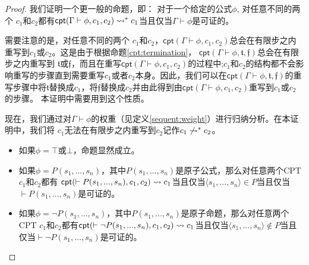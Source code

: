\begin{proof}
	我们证明一个更一般的命题，即：
	对于一个给定的公式$\phi$, 对任意不同的两个\CPT{} $c_1$和$c_2$都有$\textsf{cpt}(\Gamma \vdash\phi, c_1, c_2) 
	\rightsquigarrow^* c_1$当且仅当$\Gamma \vdash \phi$是可证的。 
	
	
	需要注意的是，对任意不同的两个\CPT{} $c_1$和$c_2$，$\textsf{cpt}(\Gamma \vdash\phi, c_1, c_2)$总会在有限步之内重写到$c_1$或$c_2$。这是由于根据命题\ref{cpt:termination}，
	$\textsf{cpt}(\Gamma \vdash\phi, \mathfrak{t}, \mathfrak{f})$总会在有限步之内重写到 $\mathfrak{t}$或$\mathfrak{f}$，而且在重写$\textsf{cpt}(\Gamma \vdash\phi, c_1, c_2)$的过程中;$c_1$和$c_2$的结构都不会影响重写的步骤直到需要重写$c_1$或者$c_2$本身。因此，我们可以在$\textsf{cpt}(\Gamma \vdash\phi, \mathfrak{t}, \mathfrak{f})$的重写步骤中将$\mathfrak{t}$替换成$c_1$，将$\mathfrak{f}$替换成$c_2$并由此得到由$\textsf{cpt}(\Gamma \vdash\phi, c_1, c_2)$重写到$c_1$或$c_2$的步骤。
	本证明中需要用到这个性质。
	
	
	现在，我们通过对$\Gamma\vdash\phi$的权重（见定义\ref{sequent:weight}）进行归纳分析。在本证明中，我们将\CPT{} $c_1$无法在有限步之内重写到$c_2$记作$c_1\not\rightsquigarrow^*c_2$。
	\begin{itemize}
		\item 如果$\phi=\top$或$\bot$，命题显然成立。
		\item 如果$\phi=P(s_1,...,s_n)$，其中$P(s_1,...,s_n)$是原子公式，那么对任意两个\textsf{CPT} $c_1$和$c_2$都有
		$\textsf{cpt}(\vdash P(s_1,...,s_n), c_1, c_2)\rightsquigarrow c_1$当且仅当$\langle
		s_1,...,s_n\rangle \in P$当且仅当$\vdash P(s_1,...,s_n)$是可证的。
		\item 如果$\phi=\neg P(s_1,...,s_n)$，其中$P(s_1,...,s_n)$是原子命题，那么对任意两个\textsf{CPT} $c_1$和$c_2$都有$\textsf{cpt}(\vdash \neg P(s_1,...,s_n), c_1, c_2)\rightsquigarrow c_1$当且仅当$\langle s_1,...,s_n\rangle \notin P$当且仅当$\vdash \neg
		P(s_1,...,s_n)$是可证的。
		

\end{itemize}
\end{proof}
